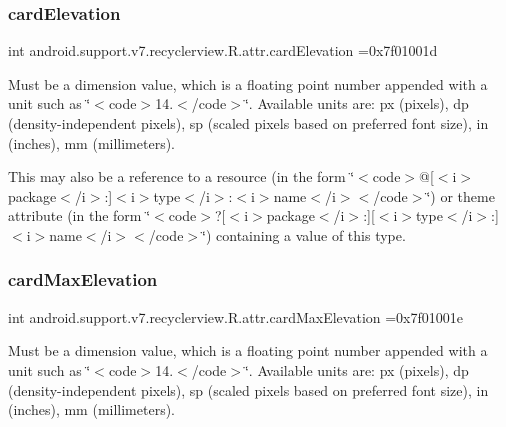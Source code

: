 \subsubsection{\texorpdfstring{card\+Elevation}{cardElevation}}
{\footnotesize\ttfamily int android.\+support.\+v7.\+recyclerview.\+R.\+attr.\+card\+Elevation =0x7f01001d\hspace{0.3cm}{\ttfamily [static]}}

Must be a dimension value, which is a floating point number appended with a unit such as \char`\"{}$<$code$>$14.\+5sp$<$/code$>$\char`\"{}. Available units are\+: px (pixels), dp (density-\/independent pixels), sp (scaled pixels based on preferred font size), in (inches), mm (millimeters). 

This may also be a reference to a resource (in the form \char`\"{}$<$code$>$@\mbox{[}$<$i$>$package$<$/i$>$\+:\mbox{]}$<$i$>$type$<$/i$>$\+:$<$i$>$name$<$/i$>$$<$/code$>$\char`\"{}) or theme attribute (in the form \char`\"{}$<$code$>$?\mbox{[}$<$i$>$package$<$/i$>$\+:\mbox{]}\mbox{[}$<$i$>$type$<$/i$>$\+:\mbox{]}$<$i$>$name$<$/i$>$$<$/code$>$\char`\"{}) containing a value of this type. \mbox{\label{classandroid_1_1support_1_1v7_1_1recyclerview_1_1R_1_1attr_a5f09c1b0941cb2b74cd3654916a43c9c}} 
\subsubsection{\texorpdfstring{card\+Max\+Elevation}{cardMaxElevation}}
{\footnotesize\ttfamily int android.\+support.\+v7.\+recyclerview.\+R.\+attr.\+card\+Max\+Elevation =0x7f01001e\hspace{0.3cm}{\ttfamily [static]}}

Must be a dimension value, which is a floating point number appended with a unit such as \char`\"{}$<$code$>$14.\+5sp$<$/code$>$\char`\"{}. Available units are\+: px (pixels), dp (density-\/independent pixels), sp (scaled pixels based on preferred font size), in (inches), mm (millimeters). 

